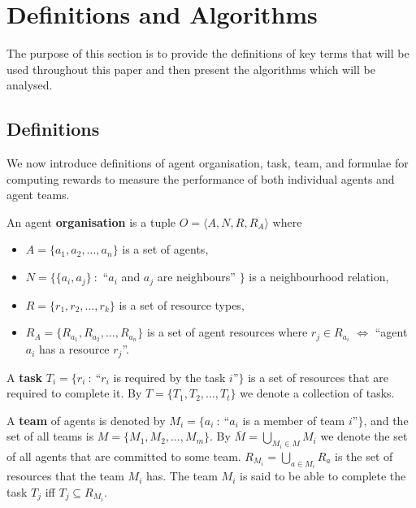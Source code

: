 \documentclass{llncs}
\begin{document}
\section{Definitions and Algorithms}

The purpose of this section is to provide the definitions of key terms that will be used throughout this paper and then present the algorithms which will be analysed.

\subsection{Definitions}

We now introduce definitions of agent organisation, task, team, and formulae for computing rewards to measure the performance of both individual agents and agent teams.

\begin{definition}
An agent \textbf{organisation} is a tuple $O=\langle A, N, R, R_A  \rangle$ where
\noindent
\begin{itemize}
\item $A= \{ a_1,a_2,...,a_n \} $ is a set of agents,
\item $N=\{\{a_i,a_j \}\ :$ ``$a_i$ and $a_j$ are neighbours'' $\}$ is a neighbourhood relation,
\item $R=\{r_1,r_2,\dots,r_k\}$ is a set of resource types,
\item $R_A=\{R_{a_1}, R_{a_2}, \dots, R_{a_n}\}$ is a set of agent resources where $r_j \in R_{a_i} $ $\iff$ ``agent $a_i$ has a resource $r_j$''.
\end{itemize}
\end{definition}

\begin{definition}
A \textbf{task} $T_i=\{r_i\ :\ $``$r_i$ is required by the task $i$''$\}$ is a set of resources that are required to complete it. By $T=\{T_1, T_2,\dots, T_t\}$ we denote a collection of tasks.
\end{definition}

\begin{definition}
A \textbf{team} of agents is denoted by $M_i=\{a_i\ :\ $``$a_i$ is a member of team $i$''$\}$, and the set of all teams is $M=\{M_1, M_2,\dots , M_m\}$. By $\bar{M} = \bigcup_{M_i \in M} M_i$ we denote the set of all agents that are committed to some team. $R_{M_i}=\bigcup_{a \in M_i}R_{a}$ is the set of resources that the team $M_i$ has. The team $M_i$ is said to be able to complete the task $T_j$ iff $T_j \subseteq R_{M_i}$.
\end{definition}
\end{document}

